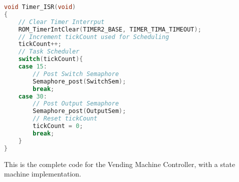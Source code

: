 \documentclass{article}
\begin{document}
      \begin{lstlisting}[basicstyle = \small, language = C]
void Timer_ISR(void)
{
    // Clear Timer Interrput
    ROM_TimerIntClear(TIMER2_BASE, TIMER_TIMA_TIMEOUT);
    // Increment tickCount used for Scheduling
    tickCount++;
    // Task Scheduler
    switch(tickCount){
    case 15:
        // Post Switch Semaphore
        Semaphore_post(SwitchSem);
        break;
    case 30:
        // Post Output Semaphore
        Semaphore_post(OutputSem);
        // Reset tickCount
        tickCount = 0;
        break;
    }
}
  \end{lstlisting}
This is the complete code for the Vending Machine Controller, with a state machine implementation.
\end{document}

